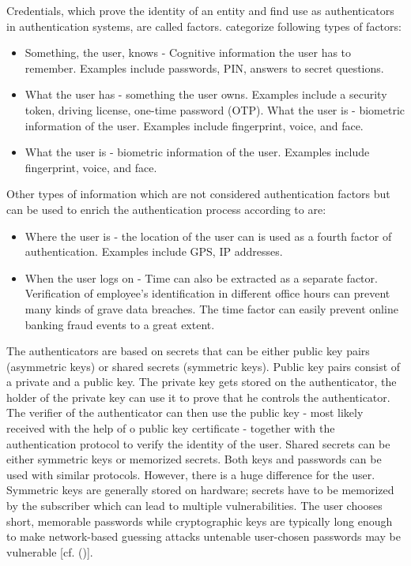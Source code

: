Credentials, which prove the identity of an entity and find use as authenticators in authentication systems, are called factors. \cite{NIST:2017:DIG} categorize following types of factors:

\begin{itemize}  
	\item Something, the user, knows - Cognitive information the user has to remember. Examples include passwords, PIN, answers to secret questions.
	\item What the user has - something the user owns. Examples include a security token, driving license, one-time password (OTP). 
	What the user is - biometric information of the user. Examples include fingerprint, voice, and face.  
	\item What the user is - biometric information of the user. Examples include fingerprint, voice, and face. 
\end{itemize}

Other types of information which are not considered authentication factors but  can be used to enrich the authentication process according to \cite{Dasgupta:2017:AUA} are:

\begin{itemize}
	\item Where the user is - the location of the user can is used as a fourth factor of authentication. Examples include GPS, IP addresses.
	\item When the user logs on - Time can also be extracted as a separate factor. Verification of employee’s identification in different office hours can prevent many kinds of grave data breaches. The time factor can easily prevent online banking fraud events to a great extent. 
\end{itemize}

The authenticators are based on secrets that can be either public key pairs (asymmetric keys) or shared secrets (symmetric keys). Public key pairs consist of a private and a public key. The private key gets stored on the authenticator, the holder of the private key can use it to prove that he controls the authenticator. The verifier of the authenticator can then use the public key - most likely received with the help of o public key certificate - together with the authentication protocol to verify the identity of the user. Shared secrets can be either symmetric keys or memorized secrets. Both keys and passwords can be used with similar protocols. However, there is a huge difference for the user. Symmetric keys are generally stored on hardware; secrets have to be memorized by the subscriber which can lead to multiple vulnerabilities. The user chooses short, memorable passwords while cryptographic keys are typically long enough to make network-based guessing attacks untenable user-chosen passwords may be vulnerable [cf. (\cite{NIST:2017:DIG})]. 


